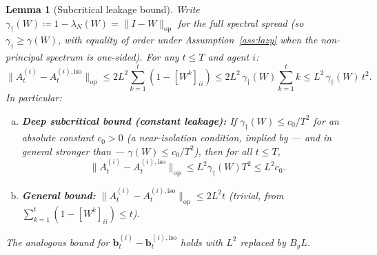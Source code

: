 \documentclass[11pt]{article}
\newtheorem{lemma}[theorem]{Lemma}
\begin{document}
\begin{lemma}[Subcritical leakage bound]\label{lem:leakage}
Write $\gamma_\dagger(W)\coloneqq 1-\lambda_N(W)=\|I-W\|_{\mathrm{op}}$
for the \emph{full} spectral spread (so $\gamma_\dagger\geq\gamma(W)$,
with equality of order under Assumption~\ref{ass:lazy} when the
non-principal spectrum is one-sided).  For any $t\leq T$ and agent $i$:
\begin{equation}
\|A_t^{(i)}-A_t^{(i),\mathrm{iso}}\|_{\mathrm{op}}
\leq 2L^2\sum_{k=1}^t(1-[W^k]_{ii})
\leq 2L^2\,\gamma_\dagger(W)\sum_{k=1}^t k
\leq L^2\,\gamma_\dagger(W)\,t^2.
\label{eq:leakage_exact}
\end{equation}
In particular:
\begin{enumerate}[(a)]
\item \textbf{Deep subcritical bound (constant leakage):}
If $\gamma_\dagger(W)\leq c_0/T^2$ for an absolute constant $c_0>0$
(a near-isolation condition, implied by --- and in general stronger
than --- $\gamma(W)\leq c_0/T^2$), then for all $t\leq T$,
\begin{equation}
\|A_t^{(i)}-A_t^{(i),\mathrm{iso}}\|_{\mathrm{op}}
\leq L^2\gamma_\dagger(W)T^2\leq L^2 c_0.
\label{eq:leakage_const}
\end{equation}
\item \textbf{General bound:}
$\|A_t^{(i)}-A_t^{(i),\mathrm{iso}}\|_{\mathrm{op}}\leq 2L^2 t$
(trivial, from $\sum_{k=1}^t(1-[W^k]_{ii})\leq t$).
\end{enumerate}
The analogous bound for $\bm{b}_t^{(i)}-\bm{b}_t^{(i),\mathrm{iso}}$
holds with $L^2$ replaced by $B_y L$.
\end{lemma}
\end{document}
